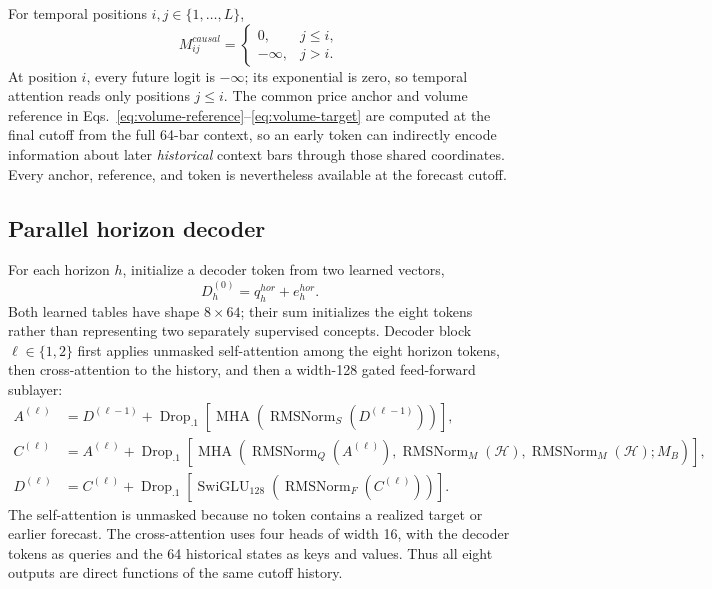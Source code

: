\documentclass[10pt]{article}
\newcommand{\RMSNorm}{\operatorname{RMSNorm}}
\newcommand{\MHA}{\operatorname{MHA}}
\begin{document}
For temporal positions $i,j\in\{1,\ldots,L\}$,
\begin{equation}
M^{causal}_{ij}=\begin{cases}0,&j\le i,\\-\infty,&j>i.\end{cases}
\label{eq:causal-mask}
\end{equation}
At position $i$, every future logit is $-\infty$; its exponential is zero, so temporal attention
reads only positions $j\le i$. The common price anchor and volume reference in
Eqs.~\eqref{eq:volume-reference}--\eqref{eq:volume-target} are computed at the final cutoff from the
full 64-bar context, so an early token can indirectly encode information about later \emph{historical}
context bars through those shared coordinates. Every anchor, reference, and token is nevertheless
available at the forecast cutoff.

\subsection{Parallel horizon decoder}

For each horizon $h$, initialize a decoder token from two learned vectors,
\begin{equation}
D_h^{(0)}=q_h^{hor}+e_h^{hor}.
\end{equation}
Both learned tables have shape $8\times64$; their sum initializes the eight tokens rather than
representing two separately supervised concepts. Decoder block $\ell\in\{1,2\}$ first applies
unmasked self-attention among the eight horizon tokens, then cross-attention to the history, and then
a width-128 gated feed-forward sublayer:
\begin{align}
A^{(\ell)}&=D^{(\ell-1)}+\operatorname{Drop}_{.1}\!\left[
\MHA\!\left(\RMSNorm_S(D^{(\ell-1)})\right)\right],\\
C^{(\ell)}&=A^{(\ell)}+\operatorname{Drop}_{.1}\!\left[
\MHA\!\left(\RMSNorm_Q(A^{(\ell)}),
\RMSNorm_M(\mathcal H),\RMSNorm_M(\mathcal H);M_B\right)\right],\\
D^{(\ell)}&=C^{(\ell)}+\operatorname{Drop}_{.1}\!\left[
\operatorname{SwiGLU}_{128}(\RMSNorm_F(C^{(\ell)}))\right].
\label{eq:decoder-block}
\end{align}
The self-attention is unmasked because no token contains a realized target or earlier forecast. The
cross-attention uses four heads of width 16, with the decoder tokens as queries and the 64 historical
states as keys and values. Thus all eight outputs are direct functions of the same cutoff history.
\end{document}
